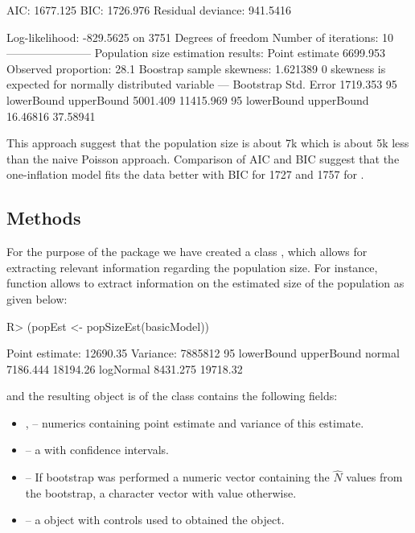 \documentclass[
]{jss}
\newcommand{\1}{\mathcal{I}} \newcommand{\bZero}{\boldsymbol{0}}
\begin{document}
\begin{CodeChunk}
\begin{CodeOutput}
AIC: 1677.125
BIC: 1726.976
Residual deviance: 941.5416

Log-likelihood: -829.5625 on 3751 Degrees of freedom 
Number of iterations: 10
-----------------------
Population size estimation results: 
Point estimate 6699.953
Observed proportion: 28.1%
Boostrap sample skewness: 1.621389
0 skewness is expected for normally distributed variable
---
Bootstrap Std. Error 1719.353
95%
lowerBound upperBound 
  5001.409  11415.969 
95%
lowerBound upperBound 
  16.46816   37.58941 
\end{CodeOutput}
\end{CodeChunk}

This approach suggest that the population size is about 7k which is
about 5k less than the naive Poisson approach. Comparison of AIC and BIC
suggest that the one-inflation model fits the data better with BIC for
 1727 and 1757 for .

\subsection{Methods}\label{methods}

For the purpose of the package we have created a class
,  
which allows for extracting relevant information regarding the
population size. For instance, function  allows to
extract information on the estimated size of the population as given
below:

\begin{CodeChunk}
\begin{CodeInput}
R> (popEst <- popSizeEst(basicModel))
\end{CodeInput}
\begin{CodeOutput}
Point estimate: 12690.35
Variance: 7885812
95%
          lowerBound upperBound
normal      7186.444   18194.26
logNormal   8431.275   19718.32
\end{CodeOutput}
\end{CodeChunk}

and the resulting object  is of the
 class contains the following fields:

\begin{itemize}
  \item {},  -- numerics containing point estimate and variance of this estimate.
  \item {} -- a  with confidence intervals.
  \item {} -- If bootstrap was performed a numeric vector containing the $\hat{N}$ values from the bootstrap, 
  a character vector with value  otherwise.
  \item {} -- a  object with controls used to obtained the object.
\end{itemize}
\end{document}
